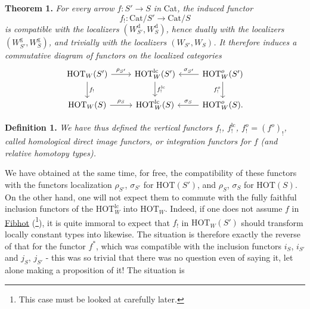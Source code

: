 \documentclass[11pt]{article}
\newcommand{\msp}[1]{\marginpar{\footnotesize [#1]}}
\newcommand{\HOT}{\mathrm{HOT}}
\newcommand{\Cat}{\mathrm{Cat}}
\begin{document}
\textbf{Theorem 1.} \textit{For every arrow $f:S'\longrightarrow S$ in} Cat\textit{, the induced functor}
\[ f_! : \Cat/S' \longrightarrow \Cat/S \]
\textit{is compatible with the localizers $(W_{S'}^{\mathrm{d}},W_S^{\mathrm{d}})$, hence dually with the localizers $(W_{S'}^{\mathrm{g}},W_S^{\mathrm{g}})$, and trivially with the localizers $(W_{S'},W_S)$. It therefore induces a commutative diagram of functors on the localized categories}
\[
\begin{tikzcd}
\HOT_W(S') \arrow[r, "\rho_{S'}"] \arrow[d, "f_!"] & \HOT_W^{\mathrm{lc}}(S') \arrow[d, "f_!^{\mathrm{lc}}"] & \HOT_W^o(S') \arrow[l, "\sigma_{S'}"'] \arrow[d, "f_!^o"'] \\
\HOT_W(S) \arrow[r, "\rho_S"] & \HOT_W^{\mathrm{lc}}(S) & \HOT_W^o(S). \arrow[l, "\sigma_S"']
\end{tikzcd}
\]

\textbf{Definition 1.} \textit{We have thus defined the vertical functors $f_!$, $f_!^{\mathrm{lc}}$, $f_!^o=(f^o)_!$, called homological direct image functors, or integration functors for $f$ (and relative homotopy types).}

\msp{page 137}
We have obtained at the same time, for free, the compatibility of these functors with the functors localization $\rho_{S'}$, $\sigma_{S'}$ for $\HOT(S')$, and $\rho_S$, $\sigma_S$ for $\HOT(S)$. On the other hand, one will not expect them to commute with the fully faithful inclusion functors of the $\HOT_W^{\mathrm{lc}}$ into $\HOT_W$. Indeed, if one does not assume $f$ in \underline{Fibhot} (\footnote[67]{This case must be looked at carefully later.}), it is quite immoral to expect that $f_!$ in $\HOT_W(S')$ should transform locally constant types into likewise. The situation is therefore exactly the reverse of that for the functor $f^*$, which was compatible with the inclusion functors $i_S$, $i_{S'}$ and $j_S$, $j_{S'}$ - this was so trivial that there was no question even of saying it, let alone making a proposition of it! The situation is
\end{document}
